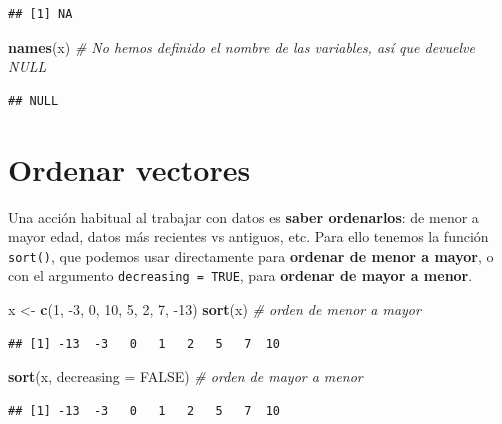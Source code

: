 \documentclass[11pt,]{book}
\newenvironment{Shaded}{\begin{snugshade}}{\end{snugshade}}
\newcommand{\CommentTok}[1]{\textcolor[rgb]{0.37,0.37,0.37}{\textit{#1}}}
\newcommand{\DataTypeTok}[1]{\textcolor[rgb]{0.27,0.27,0.27}{#1}}
\newcommand{\DecValTok}[1]{\textcolor[rgb]{0.06,0.06,0.06}{#1}}
\newcommand{\KeywordTok}[1]{\textcolor[rgb]{0.27,0.27,0.27}{\textbf{#1}}}
\newcommand{\NormalTok}[1]{#1}
\newcommand{\OtherTok}[1]{\textcolor[rgb]{0.37,0.37,0.37}{#1}}
\newcommand{\StringTok}[1]{\textcolor[rgb]{0.5,0.5,0.5}{#1}}
\begin{document}
\begin{verbatim}
## [1] NA
\end{verbatim}

\begin{Shaded}
\begin{Highlighting}[]
\KeywordTok{names}\NormalTok{(x) }\CommentTok{# No hemos definido el nombre de las variables, así que devuelve NULL}
\end{Highlighting}
\end{Shaded}

\begin{verbatim}
## NULL
\end{verbatim}

\hypertarget{ordenar-vectores}{%
\section{Ordenar vectores}\label{ordenar-vectores}}

Una acción habitual al trabajar con datos es \textbf{saber ordenarlos}: de menor a mayor edad, datos más recientes vs antiguos, etc. Para ello tenemos la función \texttt{sort()}, que podemos usar directamente para \textbf{ordenar de menor a mayor}, o con el argumento \texttt{decreasing\ =\ TRUE}, para \textbf{ordenar de mayor a menor}.

\begin{Shaded}
\begin{Highlighting}[]
\NormalTok{x <-}\StringTok{ }\KeywordTok{c}\NormalTok{(}\DecValTok{1}\NormalTok{, }\DecValTok{-3}\NormalTok{, }\DecValTok{0}\NormalTok{, }\DecValTok{10}\NormalTok{, }\DecValTok{5}\NormalTok{, }\DecValTok{2}\NormalTok{, }\DecValTok{7}\NormalTok{, }\DecValTok{-13}\NormalTok{)}
\KeywordTok{sort}\NormalTok{(x) }\CommentTok{# orden de menor a mayor}
\end{Highlighting}
\end{Shaded}

\begin{verbatim}
## [1] -13  -3   0   1   2   5   7  10
\end{verbatim}

\begin{Shaded}
\begin{Highlighting}[]
\KeywordTok{sort}\NormalTok{(x, }\DataTypeTok{decreasing =} \OtherTok{FALSE}\NormalTok{) }\CommentTok{# orden de mayor a menor}
\end{Highlighting}
\end{Shaded}

\begin{verbatim}
## [1] -13  -3   0   1   2   5   7  10
\end{verbatim}
\end{document}
